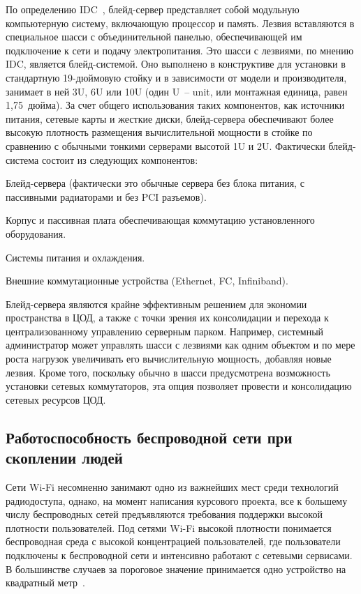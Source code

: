 По определению IDC~\cite{idc}, блейд-сервер представляет собой модульную  компьютерную систему, включающую процессор и память. Лезвия вставляются в специальное шасси с объединительной панелью, обеспечивающей им подключение к сети и подачу электропитания. Это шасси с лезвиями, по мнению IDC, является блейд-системой. Оно выполнено в конструктиве для установки в стандартную 19-дюймовую стойку и в зависимости от модели и производителя, занимает в ней 3U, 6U или 10U (один U~-- unit, или монтажная единица, равен 1,75~дюйма). За счет общего использования таких компонентов, как источники питания, сетевые карты и жесткие диски, блейд-сервера обеспечивают более высокую плотность размещения вычислительной мощности в стойке по сравнению с обычными тонкими серверами высотой 1U и 2U. Фактически блейд-система состоит из следующих компонентов:
\begin{enumerate_num}
    \item Блейд-сервера (фактически это обычные сервера без блока питания, с пассивными радиаторами и без PCI разъемов).
    \item Корпус и пассивная плата обеспечивающая коммутацию установленного оборудования.
    \item Системы питания и охлаждения.
    \item Внешние коммутационные устройства (Ethernet, FC, Infiniband).
\end{enumerate_num}

Блейд-сервера являются крайне эффективным решением для экономии пространства в ЦОД, а также с точки зрения их консолидации и перехода к централизованному управлению серверным парком. Например, системный администратор может управлять шасси с лезвиями как одним объектом и по мере роста нагрузок увеличивать его вычислительную мощность, добавляя новые лезвия. Кроме того, поскольку обычно в шасси предусмотрена возможность установки сетевых коммутаторов, эта опция позволяет провести и консолидацию сетевых ресурсов ЦОД.

\subsection{Работоспособность беспроводной сети при скоплении людей}

Сети Wi-Fi несомненно занимают одно из важнейших мест среди технологий радиодоступа, однако, на момент написания курсового проекта, все к большему числу беспроводных сетей предъявляются требования поддержки высокой плотности пользователей. Под сетями Wi-Fi высокой плотности понимается беспроводная среда с высокой концентрацией пользователей, где пользователи подключены к беспроводной сети и интенсивно работают с сетевыми сервисами. В большинстве случаев за пороговое значение принимается одно устройство на квадратный метр~\cite{wi-fi_vysokoy_plotnosti}. 

